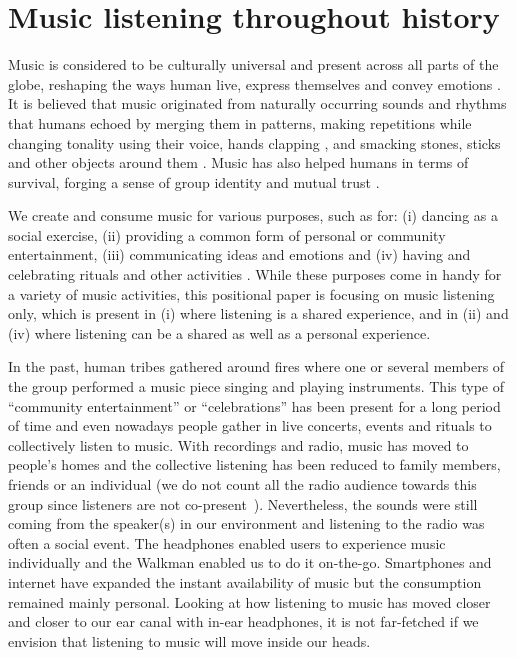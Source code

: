 \documentclass[sigchi]{acmart}
\begin{document}
\section{Music listening throughout history}

Music is considered to be culturally universal \cite{campbell1997music, seeger1971reflections} and present across all parts of the globe, reshaping the ways human live, express themselves and convey emotions \cite{juslin2001music,montagu2017music}. It is believed that music originated from naturally occurring sounds and rhythms that humans echoed by merging them in patterns, making repetitions while changing tonality using their voice\cite{montagu2017music, morley2013prehistory}, hands clapping \cite{kassler1987dancing}, and smacking stones, sticks and other objects around them \cite{montagu2014horns}. Music has also helped humans in terms of survival, forging a sense of group identity and mutual trust \cite{conard2009new}. 

We create and consume music for various purposes, such as for: (i) dancing as a social exercise, (ii) providing a common form of personal or community entertainment, (iii) communicating ideas and emotions and (iv) having and celebrating rituals and other activities \cite{montagu2017music}. While these purposes come in handy for a variety of music activities, this positional paper is focusing on music listening only, which is present in (i) where listening is a shared experience, and in (ii) and (iv) where listening can be a shared as well as a personal experience. 

In the past, human tribes gathered around fires where one or several members of the group performed a music piece singing and playing instruments. This type of ``community entertainment'' or ``celebrations'' has been present for a long period of time and even nowadays people gather in live concerts, events and rituals to collectively listen to music. With recordings and radio, music has moved to people's homes and the collective listening has been reduced to family members, friends or an individual (we do not count all the radio audience towards this group since listeners are not co-present~\cite{bonini2014new}). Nevertheless, the sounds were still coming from the speaker(s) in our environment and listening to the radio was often a social event. The headphones enabled users to experience music individually and the Walkman enabled us to do it on-the-go. Smartphones and internet have expanded the instant availability of music but the consumption remained mainly personal. Looking at how listening to music has moved closer and closer to our ear canal with in-ear headphones, it is not far-fetched if we envision that listening to music will move inside our heads.
\end{document}
